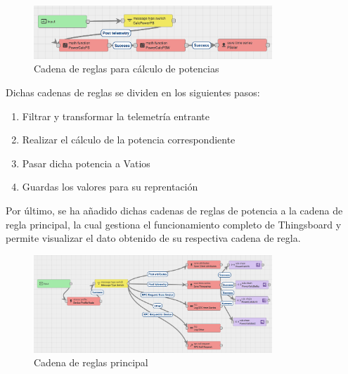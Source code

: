 \begin{figure}[H]
    \centering
    \includegraphics[width=0.8\textwidth]{images/3-software/3-2-2-thingsboard/CadenaPotencia.png}
    \caption{Cadena de reglas para cálculo de potencias}
    \label{fig:3-2-2-CadenaPotenciaThingsBoard}
\end{figure}

Dichas cadenas de reglas se dividen en los siguientes pasos:

\begin{enumerate}
    \item Filtrar y transformar la telemetría entrante
    \item Realizar el cálculo de la potencia correspondiente
    \item Pasar dicha potencia a Vatios
    \item Guardas los valores para su reprentación
\end{enumerate}

Por último, se ha añadido dichas cadenas de reglas de potencia a la cadena de regla principal, la cual gestiona el funcionamiento completo de Thingsboard y permite visualizar el dato obtenido de su respectiva cadena de regla.

\begin{figure}[H]
    \centering
    \includegraphics[width=0.8\textwidth]{images/3-software/3-2-2-thingsboard/CadenaPrincipal.png}
    \caption{Cadena de reglas principal}
    \label{fig:3-2-2-CadenaPrincipalThingsBoard}
\end{figure}

